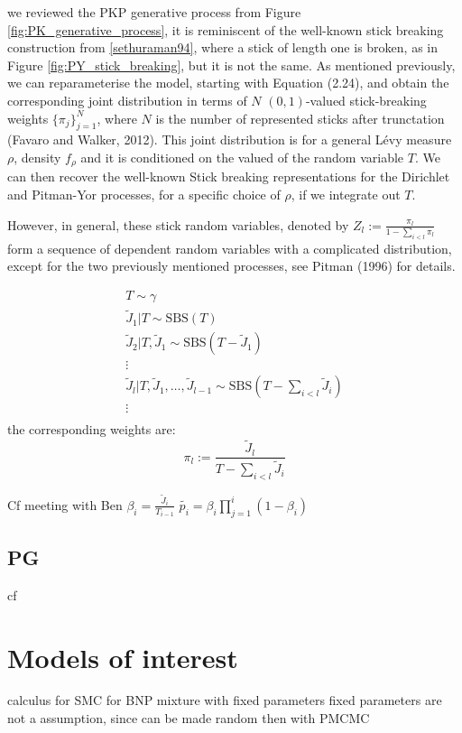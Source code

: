 we reviewed the PKP generative process from Figure \ref{fig:PK_generative_process}, it is reminiscent of the well-known stick breaking construction from \ref{sethuraman94}, where a stick of length one is broken, as in Figure \ref{fig:PY_stick_breaking}, but it is not the same. As mentioned previously, we can reparameterise the model, starting with Equation (2.24), and obtain the corresponding joint distribution in terms of $N$ $(0,1)$-valued stick-breaking weights $\{\pi_j \}_{j=1}^N$, where $N$ is the number of represented sticks after trunctation (Favaro and Walker, 2012). This joint distribution is for a general Lévy measure $\rho$, density $f_\rho$ and it is conditioned on the valued of the random variable $T$. We can then recover the well-known Stick breaking representations for the Dirichlet and Pitman-Yor processes, for a specific choice of $\rho$, if we integrate out $T$.

However, in general, these stick random variables, denoted by $Z_l := \frac{\pi_l}{1 - \sum_{i<l}{\pi_l}}$ form a sequence of dependent random variables with a complicated distribution, except for the two previously mentioned processes, see Pitman (1996) for details.

\begin{gather*}
T \sim \gamma \\
\tilde{J}_1|T \sim \text{SBS}(T) \\
\tilde{J}_2|T,\tilde{J}_1 \sim \text{SBS}(T - \tilde{J}_1) \\
\vdots \\
\tilde{J}_{l}|T,\tilde{J}_1,\dots,\tilde{J}_{l-1} \sim \text{SBS}(T - \sum_{i<l} \tilde{J}_i) \\
\vdots \\
\end{gather*}
the corresponding weights are:
$$ \pi_l := \frac{\tilde{J}_{l}}{T - \sum_{i<l} \tilde{J}_i} $$


Cf meeting with Ben
$\beta_i = \frac{\tilde{J}_i}{T_{i-1}}$
$\tilde{p_i} = \beta_i \prod_{j=1}^i (1-\beta_i)$


\subsection{PG}
cf \cite{James:2013uk}

\section{Models of interest}
calculus for SMC for BNP mixture with fixed parameters
fixed parameters are not a assumption, since can be made random then with PMCMC

